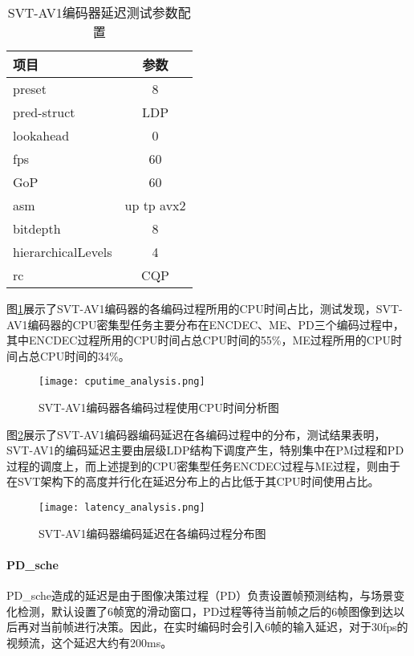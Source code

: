 \begin{table}[htbp]
	\renewcommand{\arraystretch}{0.9}
	\caption{SVT-AV1编码器延迟测试参数配置}
	\label{tab:svt-lat}
	\centering
	\begin{tabular}{lc} \toprule
		项目& 参数  \\ \midrule
		preset     &8\\
		pred-struct& LDP\\
		lookahead    &0\\
		fps    &60\\
		GoP    &60\\
		asm    & up tp avx2\\
		bitdepth & 8\\
		hierarchicalLevels  & 4 \\
		rc & CQP\\ \bottomrule
	\end{tabular}
\end{table}

图\ref{fig:cpu-ana}展示了SVT-AV1编码器的各编码过程所用的CPU时间占比，测试发现，SVT-AV1编码器的CPU密集型任务主要分布在ENCDEC、ME、PD三个编码过程中，其中ENCDEC过程所用的CPU时间占总CPU时间的55\%，ME过程所用的CPU时间占总CPU时间的34\%。

\begin{figure}[htbp]
		\centering
		\texttt{[image: cputime\_analysis.png]}
		\caption{SVT-AV1编码器各编码过程使用CPU时间分析图}
		\label{fig:cpu-ana}
\end{figure}
图\ref{fig:lat-ana}展示了SVT-AV1编码器编码延迟在各编码过程中的分布，测试结果表明，SVT-AV1的编码延迟主要由层级LDP结构下调度产生，特别集中在PM过程和PD过程的调度上，而上述提到的CPU密集型任务ENCDEC过程与ME过程，则由于在SVT架构下的高度并行化在延迟分布上的占比低于其CPU时间使用占比。

\begin{figure}[htbp]
	\centering
	\texttt{[image: latency\_analysis.png]}
	\caption{SVT-AV1编码器编码延迟在各编码过程分布图}
	\label{fig:lat-ana}
\end{figure}

\paragraph{PD\_sche} PD\_sche造成的延迟是由于图像决策过程（PD）负责设置帧预测结构，与场景变化检测，默认设置了6帧宽的滑动窗口，PD过程等待当前帧之后的6帧图像到达以后再对当前帧进行决策。因此，在实时编码时会引入6帧的输入延迟，对于30fps的视频流，这个延迟大约有200ms。

